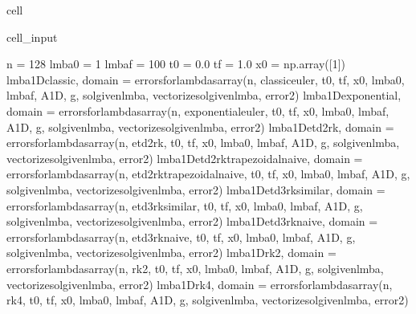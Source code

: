 \documentclass[letterpaper,10pt,english]{jupyterBook}
\begin{document}
\begin{sphinxuseclass}{cell}\begin{sphinxVerbatimInput}

\begin{sphinxuseclass}{cell_input}
\begin{sphinxVerbatim}[commandchars=\\\{\}]
n = 128
lmba0 = 1
lmbaf = 100
t0 = 0.0
tf = 1.0
x0 = np.array([1])
lmba\PYGZus{}1D\PYGZus{}classic, domain = errors\PYGZus{}for\PYGZus{}lambdas\PYGZus{}array(n, classic\PYGZus{}euler, t0, tf, x0, lmba0, lmbaf, A\PYGZus{}1D, g, sol\PYGZus{}given\PYGZus{}lmba, vectorize\PYGZus{}sol\PYGZus{}given\PYGZus{}lmba, error\PYGZus{}2)
lmba\PYGZus{}1D\PYGZus{}exponential, domain = errors\PYGZus{}for\PYGZus{}lambdas\PYGZus{}array(n, exponential\PYGZus{}euler, t0, tf, x0, lmba0, lmbaf, A\PYGZus{}1D, g, sol\PYGZus{}given\PYGZus{}lmba, vectorize\PYGZus{}sol\PYGZus{}given\PYGZus{}lmba, error\PYGZus{}2)
lmba\PYGZus{}1D\PYGZus{}etd2rk, domain = errors\PYGZus{}for\PYGZus{}lambdas\PYGZus{}array(n, etd2rk, t0, tf, x0, lmba0, lmbaf, A\PYGZus{}1D, g, sol\PYGZus{}given\PYGZus{}lmba, vectorize\PYGZus{}sol\PYGZus{}given\PYGZus{}lmba, error\PYGZus{}2)
lmba\PYGZus{}1D\PYGZus{}etd2rk\PYGZus{}trapezoidal\PYGZus{}naive, domain = errors\PYGZus{}for\PYGZus{}lambdas\PYGZus{}array(n, etd2rk\PYGZus{}trapezoidal\PYGZus{}naive, t0, tf, x0, lmba0, lmbaf, A\PYGZus{}1D, g, sol\PYGZus{}given\PYGZus{}lmba, vectorize\PYGZus{}sol\PYGZus{}given\PYGZus{}lmba, error\PYGZus{}2)
lmba\PYGZus{}1D\PYGZus{}etd3rk\PYGZus{}similar, domain = errors\PYGZus{}for\PYGZus{}lambdas\PYGZus{}array(n, etd3rk\PYGZus{}similar, t0, tf, x0, lmba0, lmbaf, A\PYGZus{}1D, g, sol\PYGZus{}given\PYGZus{}lmba, vectorize\PYGZus{}sol\PYGZus{}given\PYGZus{}lmba, error\PYGZus{}2)
lmba\PYGZus{}1D\PYGZus{}etd3rk\PYGZus{}naive, domain = errors\PYGZus{}for\PYGZus{}lambdas\PYGZus{}array(n, etd3rk\PYGZus{}naive, t0, tf, x0, lmba0, lmbaf, A\PYGZus{}1D, g, sol\PYGZus{}given\PYGZus{}lmba, vectorize\PYGZus{}sol\PYGZus{}given\PYGZus{}lmba, error\PYGZus{}2)
lmba\PYGZus{}1D\PYGZus{}rk2, domain = errors\PYGZus{}for\PYGZus{}lambdas\PYGZus{}array(n, rk2, t0, tf, x0, lmba0, lmbaf, A\PYGZus{}1D, g, sol\PYGZus{}given\PYGZus{}lmba, vectorize\PYGZus{}sol\PYGZus{}given\PYGZus{}lmba, error\PYGZus{}2)
lmba\PYGZus{}1D\PYGZus{}rk4, domain = errors\PYGZus{}for\PYGZus{}lambdas\PYGZus{}array(n, rk4, t0, tf, x0, lmba0, lmbaf, A\PYGZus{}1D, g, sol\PYGZus{}given\PYGZus{}lmba, vectorize\PYGZus{}sol\PYGZus{}given\PYGZus{}lmba, error\PYGZus{}2)
\end{sphinxVerbatim}


\end{sphinxuseclass}
\end{sphinxVerbatimInput}
\end{sphinxuseclass}
\end{document}
